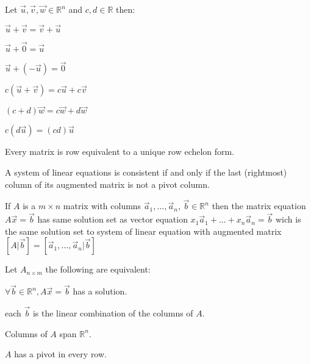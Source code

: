\documentclass[5pt]{article}
\begin{document}
\begin{multicols}{2}
\begin{properties}
  Let $\vec{u},\vec{v}, \vec{w}\in \mathbb{R}^n$ and $c,d\in\mathbb{R}$ then:
  \begin{itemize*}
    \item $\vec{u}+\vec{v}=\vec{v}+\vec{u}$
    \item $\vec{u}+\vec{0}=\vec{u}$
    \item $\vec{u}+(-\vec{u})=\vec{0}$
    \item $c(\vec{u}+\vec{v})=c\vec{u}+c\vec{v}$
    \item $(c+d)\vec{w}=c\vec{w}+d\vec{w}$
    \item $c(d\vec{u})=(cd)\vec{u}$
  \end{itemize*}
\end{properties}

\begin{theorem}
  Every matrix is row equivalent to a unique row echelon form.
\end{theorem}

\begin{theorem}
  A system of linear equations is consistent if and only if the last (rightmost) column of its augmented
matrix is not a pivot column.
\end{theorem}

\begin{theorem}
  If $A$ is a $m\times n$ matrix  with columns $\vec{a}_1, ..., \vec{a}_n$, $\vec{b}\in\mathbb{R}^n$ 
  then the matrix equation $A\vec{x}=\vec{b}$ has same solution set as vector equation $x_1\vec{a}_1 + ... + x_n\vec{a}_n=\vec{b}$  
  wich is the same solution set to system of linear equation with augmented matrix 
  $\left[A|\vec{b}\right]=\left[\vec{a}_1, ..., \vec{a}_n|\vec{b}\right]$ 
\end{theorem}

\begin{theorem}
  Let $A_{n\times m}$ the following are equivalent:
  \begin{itemize*}
    \item $\forall\vec{b}\in\mathbb{R}^n, A\vec{x}=\vec{b}$ has a solution.
    \item each $\vec{b}$ is the linear combination of the columns of $A$.
    \item Columns of $A$ span $\mathbb{R}^n$.
    \item $A$ has a pivot in every row.
  \end{itemize*}
\end{theorem}


\end{multicols}
\end{document}
